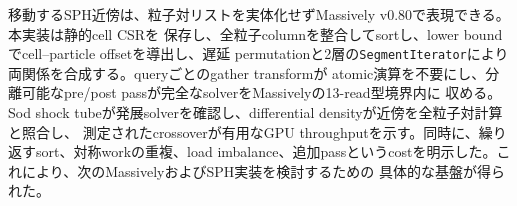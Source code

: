 \documentclass[a4paper,10pt]{ltjsarticle}
\newcommand{\code}[1]{\texttt{#1}}
\begin{document}
移動するSPH近傍は、粒子対リストを実体化せずMassively v0.80で表現できる。本実装は静的cell CSRを
保存し、全粒子columnを整合してsortし、lower boundでcell--particle offsetを導出し、遅延
permutationと2層の\code{SegmentIterator}により両関係を合成する。queryごとのgather transformが
atomic演算を不要にし、分離可能なpre/post passが完全なsolverをMassivelyの13-read型境界内に
収める。Sod shock tubeが発展solverを確認し、differential densityが近傍を全粒子対計算と照合し、
測定されたcrossoverが有用なGPU throughputを示す。同時に、繰り返すsort、対称workの重複、load
imbalance、追加passというcostを明示した。これにより、次のMassivelyおよびSPH実装を検討するための
具体的な基盤が得られた。

{\small


}
\end{document}
